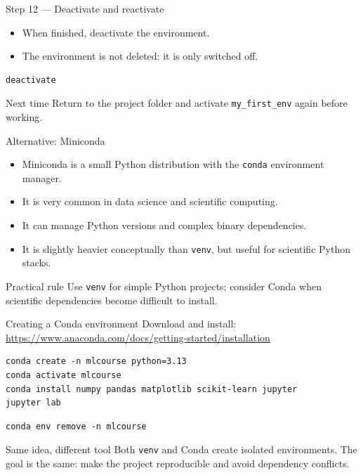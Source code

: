 \documentclass[aspectratio=169]{beamer}
\newcommand{\coursefooter}{}
\begin{document}
\begin{frame}[fragile]{Step 12 --- Deactivate and reactivate}
\begin{itemize}
\item When finished, deactivate the environment.
\item The environment is not deleted: it is only switched off.
\end{itemize}
\begin{lstlisting}[style=coursebash]
deactivate
\end{lstlisting}
\begin{block}{Next time}
Return to the project folder and activate \texttt{my\_first\_env} again before working.
\end{block}
\coursefooter
\end{frame}

\begin{frame}{Alternative: Miniconda}
\begin{itemize}
\item Miniconda is a small Python distribution with the \texttt{conda} environment manager.
\item It is very common in data science and scientific computing.
\item It can manage Python versions and complex binary dependencies.
\item It is slightly heavier conceptually than \texttt{venv}, but useful for scientific Python stacks.
\end{itemize}
\begin{block}{Practical rule}
Use \texttt{venv} for simple Python projects; consider Conda when scientific dependencies become difficult to install.
\end{block}
\coursefooter
\end{frame}

\begin{frame}[fragile]{Creating a Conda environment}
Download and install: \url{https://www.anaconda.com/docs/getting-started/installation}

\begin{lstlisting}[style=coursebash]
conda create -n mlcourse python=3.13
conda activate mlcourse
conda install numpy pandas matplotlib scikit-learn jupyter
jupyter lab
\end{lstlisting}

\begin{lstlisting}[style=coursebash]
conda env remove -n mlcourse
\end{lstlisting}
\begin{block}{Same idea, different tool}
Both \texttt{venv} and Conda create isolated environments. The goal is the same: make the project reproducible and avoid dependency conflicts.
\end{block}
\coursefooter
\end{frame}
\end{document}
